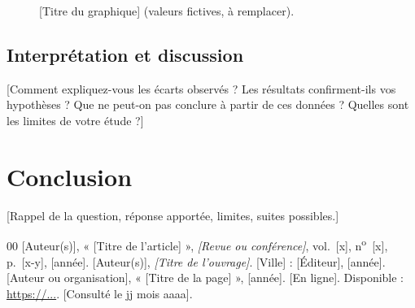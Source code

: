 \documentclass[conference,a4paper]{IEEEtran}
\begin{document}
\begin{figure}[htbp]
\centering
{}
\caption{[Titre du graphique] (valeurs fictives, à remplacer).}
\label{fig:courbes}
\end{figure}

\subsection{Interprétation et discussion}
[Comment expliquez-vous les écarts observés ? Les résultats
confirment-ils vos hypothèses ? Que ne peut-on pas conclure à partir de
ces données ? Quelles sont les limites de votre étude ?]

\section{Conclusion}
[Rappel de la question, réponse apportée, limites, suites possibles.]

\begin{thebibliography}{00}
 [Auteur(s)], « [Titre de l'article] », \textit{[Revue ou
conférence]}, vol.~[x], n\textsuperscript{o}~[x], p.~[x-y], [année].
 [Auteur(s)], \textit{[Titre de l'ouvrage]}. [Ville] :
[Éditeur], [année].
 [Auteur ou organisation], « [Titre de la page] », [année].
[En ligne]. Disponible : \url{https://...}. [Consulté le jj mois aaaa].
\end{thebibliography}
\end{document}
